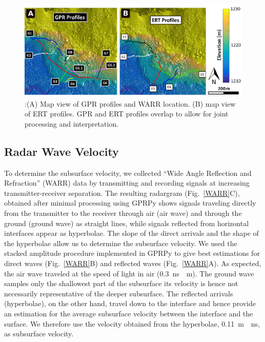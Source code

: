 \documentclass[utf8]{frontiersSCNS}
\begin{document}
								 \begin{figure}

	\includegraphics[width=\textwidth]{Figures/GPR_ERT_Map.pdf}
		\caption{:(A) Map view of GPR profiles and WARR location. (B) map view of ERT profiles. GPR and ERT profiles overlap to allow for joint processing and interpretation.  \label{GPR_ERT_Map}}
		
								   \end{figure}






\subsection{Radar Wave Velocity}\label{GPRvel}

To determine the subsurface velocity, we collected ``Wide Angle Reflection and Refraction'' (WARR) data by transmitting and recording signals at increasing transmitter-receiver separation. The resulting radargram (Fig.~\ref{WARR}C), obtained after minimal processing using GPRPy \citep{plattner2019comunity,plattner2020GPRPy} shows signals traveling directly from the transmitter to the receiver through air (air wave) and through the ground (ground wave) as straight lines, while signals reflected from horizontal interfaces appear as hyperbolae. The slope of the direct arrivals and the shape of the hyperbolae allow us to determine the subsurface velocity. We used the stacked amplitude procedure implemented in GPRPy to give best estimations for direct waves (Fig.~\ref{WARR}B) and reflected waves (Fig.~\ref{WARR}A). As expected, the air wave traveled at the speed of light in air (\SI{0.3}{ns \per m}). The ground wave samples only the shallowest part of the subsurface its velocity is hence not necessarily representative of the deeper subsurface. The reflected arrivals (hyperbolae), on the other hand, travel down to the interface and hence provide an estimation for the average subsurface velocity between the interface and the surface. We therefore use the velocity obtained from the hyperbolae, \SI{0.11}{m \per ns}, as subsurface velocity.
\end{document}
